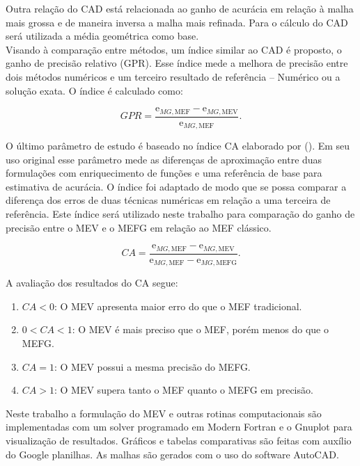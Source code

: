 \indent Outra relação do CAD está relacionada ao ganho de acurácia em relação à malha mais grossa e de maneira inversa a malha mais refinada. Para o cálculo do CAD será utilizada a média geométrica como base.\\
\indent Visando à comparação entre métodos, um índice similar ao CAD é proposto, o ganho de precisão relativo (GPR). Esse índice mede a melhora de precisão entre dois métodos numéricos e um terceiro resultado de referência -- Numérico ou a solução exata. O índice é calculado como:

\begin{equation}
    GPR = \frac{\text{e}_{MG,\text{MEF}} - \text{e}_{MG,\text{MEV}}}{\text{e}_{MG,\text{MEF}}}.
    \label{eq:1.6}
\end{equation}

\indent O último parâmetro de estudo é baseado no índice CA elaborado por (\citet{cittadin2020enriquecimento}). Em seu uso original esse parâmetro mede as diferenças de
aproximação entre duas formulações com enriquecimento de funções e uma referência de base para estimativa de acurácia. O índice foi adaptado 
de modo que se possa comparar a diferença dos erros de duas técnicas numéricas em relação a uma terceira de referência. Este índice será 
utilizado neste trabalho para comparação do ganho de precisão entre o MEV e o MEFG em relação ao MEF clássico.

\begin{equation}
    CA = \frac{\text{e}_{MG,\text{MEF}} - \text{e}_{MG,\text{MEV}}}{\text{e}_{MG,\text{MEF}} - \text{e}_{MG,\text{MEFG}}}.
    \label{eq:1.7}
\end{equation}

\indent A avaliação dos resultados do CA segue:

\begin{enumerate}
    \item $CA < 0$: O MEV apresenta maior erro do que o MEF tradicional.
    \item $0 < CA < 1$: O MEV é mais preciso que o MEF, porém menos do que o MEFG.
    \item $CA = 1$: O MEV possui a mesma precisão do MEFG.
    \item $CA > 1$: O MEV supera tanto o MEF quanto o MEFG em precisão.
\end{enumerate}

\indent Neste trabalho a formulação do MEV e outras rotinas computacionais são implementadas com um solver programado em Modern Fortran
e o Gnuplot para visualização de resultados. Gráficos e tabelas comparativas são feitas com auxílio do Google planilhas. As malhas são gerados com o uso do software AutoCAD.\\

